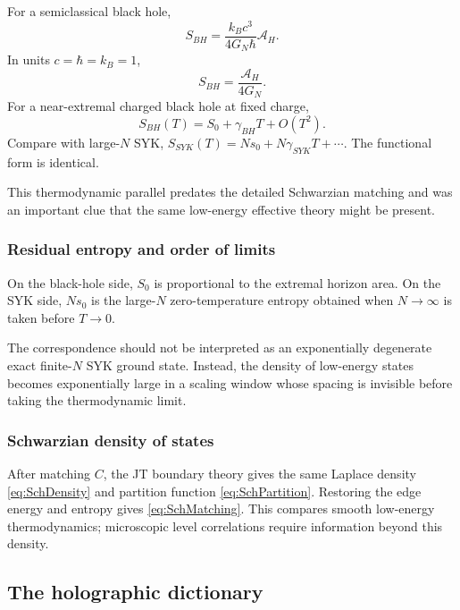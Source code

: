 \documentclass[11pt]{article}
\numberwithin{equation}{section}
\theoremstyle{exposition}
\theoremstyle{result}
\begin{document}
For a semiclassical black hole,
\begin{equation*}
S_{BH}=\frac{k_Bc^3}{4G_N\hbar}\mathcal A_H.
\end{equation*}
In units $c=\hbar=k_B=1$,
\begin{equation}
S_{BH}=\frac{\mathcal A_H}{4G_N}.
\label{eq:BHentropy}
\end{equation}
For a near-extremal charged black hole at fixed charge,
\begin{equation}
S_{BH}(T)=S_0+\gamma_{BH}T+O(T^2).
\label{eq:BHnear}
\end{equation}
Compare with large-$N$ SYK, $S_{SYK}(T)=Ns_0+N\gamma_{SYK}T+\cdots$. The functional form is identical.

This thermodynamic parallel predates the detailed Schwarzian matching and was an important clue that the same low-energy effective theory might be present.

\subsubsection{Residual entropy and order of limits}

On the black-hole side, $S_0$ is proportional to the extremal horizon area. On the SYK side, $Ns_0$ is the large-$N$ zero-temperature entropy obtained when $N\to\infty$ is taken before $T\to0$.

The correspondence should not be interpreted as an exponentially degenerate exact finite-$N$ SYK ground state. Instead, the density of low-energy states becomes exponentially large in a scaling window whose spacing is invisible before taking the thermodynamic limit.

\subsubsection{Schwarzian density of states}

After matching $C$, the JT boundary theory gives the same Laplace density \eqref{eq:SchDensity} and partition function \eqref{eq:SchPartition}. Restoring the edge energy and entropy gives \eqref{eq:SchMatching}. This compares smooth low-energy thermodynamics; microscopic level correlations require information beyond this density.

\subsection{The holographic dictionary}
\end{document}
